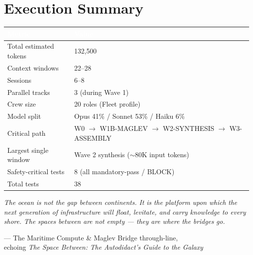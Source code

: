 \documentclass[11pt,letterpaper]{article}
\newcommand{\tableheader}[1]{\textbf{\sffamily\textcolor{white}{#1}}}
\begin{document}
\section{Execution Summary}

\begin{center}
\begin{tabularx}{\textwidth}{L{5cm}X}
\toprule
{}
\tableheader{Metric} & \tableheader{Value} \\
\midrule
Total estimated tokens & 132,500 \\
Context windows & 22--28 \\
Sessions & 6--8 \\
Parallel tracks & 3 (during Wave 1) \\
Crew size & 20 roles (Fleet profile) \\
Model split & Opus 41\% / Sonnet 53\% / Haiku 6\% \\
Critical path & W0 $\rightarrow$ W1B-MAGLEV $\rightarrow$ W2-SYNTHESIS $\rightarrow$ W3-ASSEMBLY \\
Largest single window & Wave 2 synthesis (${\sim}80$K input tokens) \\
Safety-critical tests & 8 (all mandatory-pass / BLOCK) \\
Total tests & 38 \\
\bottomrule
\end{tabularx}
\end{center}

\vspace{2em}

\begin{quotebox}
\textit{The ocean is not the gap between continents. It is the platform upon which the next generation of infrastructure will float, levitate, and carry knowledge to every shore. The spaces between are not empty --- they are where the bridges go.}

\vspace{0.5em}
\hfill --- The Maritime Compute \& Maglev Bridge through-line,\\
\hfill echoing \textit{The Space Between: The Autodidact's Guide to the Galaxy}
\end{quotebox}
\end{document}
